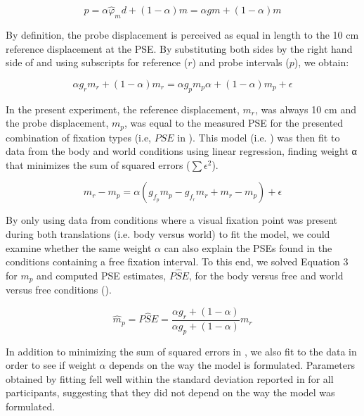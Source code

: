 \begin{equation}
\label{p3:eq2}
p = \alpha \hat{\varphi}_m d + (1 - \alpha) m = \alpha g m + (1 - \alpha) m
\end{equation}

By definition, the probe displacement is perceived as equal in length to the 10 \si{\centi\metre} reference displacement at the PSE. By substituting both sides by the right hand side of  and using subscripts for reference ($r$) and probe intervals ($p$), we obtain:

\begin{equation}
\label{p3:eq3}
\alpha g_r m_r + (1 - \alpha) m_r = \alpha  g_p m_p \alpha + (1 - \alpha) m_p + \epsilon
\end{equation}

In the present experiment, the reference displacement, $m_r$, was always 10 \si{\centi\metre} and the probe displacement, $m_p$, was equal to the measured PSE for the presented combination of fixation types (i.e, $PSE$ in ). This model (i.e. ) was then fit to data from the body and world conditions using linear regression, finding weight α that minimizes the sum of squared errors ($\sum{\epsilon^2}$).

\begin{equation}
\label{p3:eq4}
m_r - m_p = \alpha(g_{f_p} m_p - g_{f_r} m_r + m_r - m_p) + \epsilon
\end{equation}

By only using data from conditions where a visual fixation point was present during both translations (i.e. body versus world) to fit the model, we could examine whether the same weight $\alpha$ can also explain the PSEs found in the conditions containing a free fixation interval. To this end, we solved Equation 3 for $m_p$ and computed PSE estimates, $P\hat{S}E$, for the body versus free and world versus free conditions ().

\begin{equation}
\label{p3:eq5}
\hat{m}_p = P\hat{S}E = \frac
	{\alpha g_r + (1 - \alpha)}
	{\alpha g_p + (1 - \alpha)}
    m_r
\end{equation}

In addition to minimizing the sum of squared errors in , we also fit  to the data in order to see if weight $\alpha$ depends on the way the model is formulated. Parameters obtained by fitting  fell well within the standard deviation reported in  for all participants, suggesting that they did not depend on the way the model was formulated.


